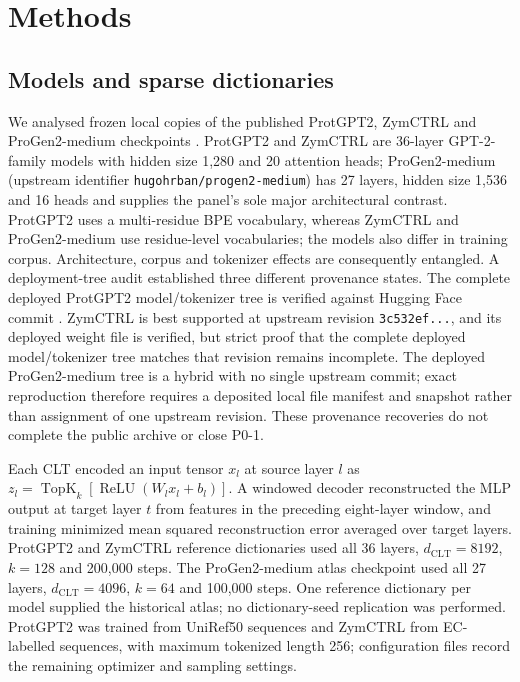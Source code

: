 \documentclass[pdflatex,sn-nature]{sn-jnl}
\newcommand{\hashvalue}[1]{\texttt{\seqsplit{#1}}}
\begin{document}
\section{Methods}\label{sec:methods}

\subsection{Models and sparse dictionaries}

We analysed frozen local copies of the published ProtGPT2, ZymCTRL and ProGen2-medium checkpoints \cite{ferruz2022protgpt2,munsamy2022zymctrl,nijkamp2023progen2}. ProtGPT2 and ZymCTRL are 36-layer GPT-2-family models with hidden size 1,280 and 20 attention heads; ProGen2-medium (upstream identifier \texttt{hugohrban/progen2-medium}) has 27 layers, hidden size 1,536 and 16 heads and supplies the panel's sole major architectural contrast. ProtGPT2 uses a multi-residue BPE vocabulary, whereas ZymCTRL and ProGen2-medium use residue-level vocabularies; the models also differ in training corpus. Architecture, corpus and tokenizer effects are consequently entangled. A deployment-tree audit established three different provenance states. The complete deployed ProtGPT2 model/tokenizer tree is verified against Hugging Face commit \hashvalue{f71aa6cf063ad784ebd53881d11332fd098eaa58}. ZymCTRL is best supported at upstream revision \texttt{3c532ef...}, and its deployed weight file is verified, but strict proof that the complete deployed model/tokenizer tree matches that revision remains incomplete. The deployed ProGen2-medium tree is a hybrid with no single upstream commit; exact reproduction therefore requires a deposited local file manifest and snapshot rather than assignment of one upstream revision. These provenance recoveries do not complete the public archive or close P0-1.

Each CLT encoded an input tensor $x_l$ at source layer $l$ as $z_l=\operatorname{TopK}_k[\operatorname{ReLU}(W_lx_l+b_l)]$. A windowed decoder reconstructed the MLP output at target layer $t$ from features in the preceding eight-layer window, and training minimized mean squared reconstruction error averaged over target layers. ProtGPT2 and ZymCTRL reference dictionaries used all 36 layers, $d_\mathrm{CLT}=8192$, $k=128$ and 200,000 steps. The ProGen2-medium atlas checkpoint used all 27 layers, $d_\mathrm{CLT}=4096$, $k=64$ and 100,000 steps. One reference dictionary per model supplied the historical atlas; no dictionary-seed replication was performed. ProtGPT2 was trained from UniRef50 sequences and ZymCTRL from EC-labelled sequences, with maximum tokenized length 256; configuration files record the remaining optimizer and sampling settings.
\end{document}

